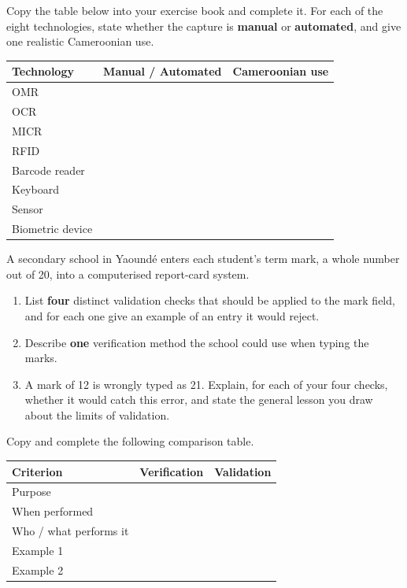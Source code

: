\documentclass[11pt]{article}
\begin{document}
\begin{exercice}
Copy the table below into your exercise book and complete it. For each of the eight technologies, state whether the capture is \textbf{manual} or \textbf{automated}, and give one realistic Cameroonian use.
\begin{center}
\begin{tabularx}{\linewidth}{|l|l|X|}
\hline
\rowcolor{popblueL} \textbf{Technology} & \textbf{Manual / Automated} & \textbf{Cameroonian use} \\
\hline
OMR & & \\
\hline
OCR & & \\
\hline
MICR & & \\
\hline
RFID & & \\
\hline
Barcode reader & & \\
\hline
Keyboard & & \\
\hline
Sensor & & \\
\hline
Biometric device & & \\
\hline
\end{tabularx}
\end{center}
\end{exercice}

\begin{exercice}
A secondary school in Yaoundé enters each student's term mark, a whole number out of 20, into a computerised report-card system.
\begin{enumerate}
\item List \textbf{four} distinct validation checks that should be applied to the mark field, and for each one give an example of an entry it would reject.
\item Describe \textbf{one} verification method the school could use when typing the marks.
\item A mark of 12 is wrongly typed as 21. Explain, for each of your four checks, whether it would catch this error, and state the general lesson you draw about the limits of validation.
\end{enumerate}
\end{exercice}

\begin{exercice}
Copy and complete the following comparison table.
\begin{center}
\begin{tabularx}{\linewidth}{|l|X|X|}
\hline
\rowcolor{popblueL} \textbf{Criterion} & \textbf{Verification} & \textbf{Validation} \\
\hline
Purpose & & \\
\hline
When performed & & \\
\hline
Who / what performs it & & \\
\hline
Example 1 & & \\
\hline
Example 2 & & \\
\hline
\end{tabularx}
\end{center}
\end{exercice}
\end{document}
